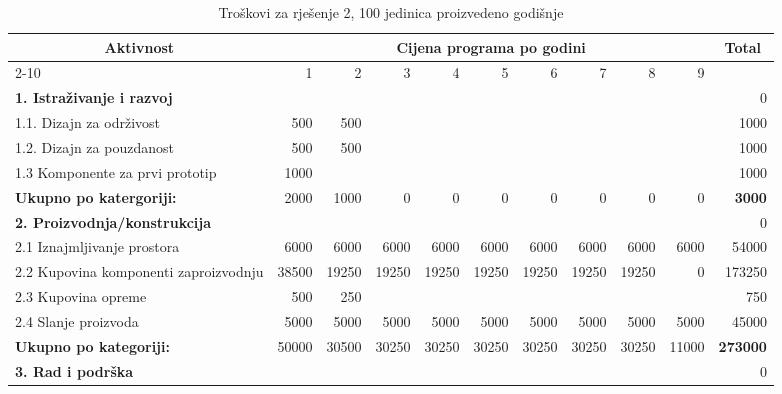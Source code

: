 \documentclass[12pt]{article}
\begin{document}
\begin{landscape}
\begin{table}[htbp]
  \centering
  \small
  \caption{Troškovi za rješenje 2, 100 jedinica proizvedeno godišnje}
    \begin{tabular}{lrrrrrrrrrr}
    \toprule
    \multicolumn{1}{c}{\multirow{2}[4]{*}{Aktivnost}} & \multicolumn{9}{c}{Cijena programa po godini}                         & \multicolumn{1}{c}{\multirow{2}[4]{*}{Total}} \\
\cmidrule{2-10}          & 1     & 2     & 3     & 4     & 5     & 6     & 7     & 8     & 9     &  \\
    \midrule
    \textbf{1. Istraživanje i razvoj} &       &       &       &       &       &       &       &       &       & 0 \\
    1.1. Dizajn za održivost & 500   & 500   &       &       &       &       &       &       &       & 1000 \\
    1.2. Dizajn za pouzdanost & 500   & 500   &       &       &       &       &       &       &       & 1000 \\
    1.3 Komponente za prvi prototip & 1000  &       &       &       &       &       &       &       &       & 1000 \\
    \midrule
    \textbf{Ukupno po katergoriji:} & 2000  & 1000  & 0     & 0     & 0     & 0     & 0     & 0     & 0     & \textbf{3000} \\
    \midrule
    \textbf{2. Proizvodnja/konstrukcija} &       &       &       &       &       &       &       &       &       & 0 \\
    2.1 Iznajmljivanje prostora & 6000  & 6000  & 6000  & 6000  & 6000  & 6000  & 6000  & 6000  & 6000  & 54000 \\
    \multicolumn{1}{p{14.715em}}{2.2 Kupovina komponenti za\newline{}proizvodnju} & 38500 & 19250 & 19250 & 19250 & 19250 & 19250 & 19250 & 19250 & 0     & 173250 \\
    2.3 Kupovina opreme & 500   & 250   &       &       &       &       &       &       &       & 750 \\
    2.4 Slanje proizvoda & 5000  & 5000  & 5000  & 5000  & 5000  & 5000  & 5000  & 5000  & 5000  & 45000 \\
    \midrule
    \textbf{Ukupno po kategoriji:} & 50000 & 30500 & 30250 & 30250 & 30250 & 30250 & 30250 & 30250 & 11000 & \textbf{273000} \\
    \midrule
    \textbf{3. Rad i podrška} &       &       &       &       &       &       &       &       &       & 0 \\

\end{tabular}
\end{table}
\end{landscape}
\end{document}
